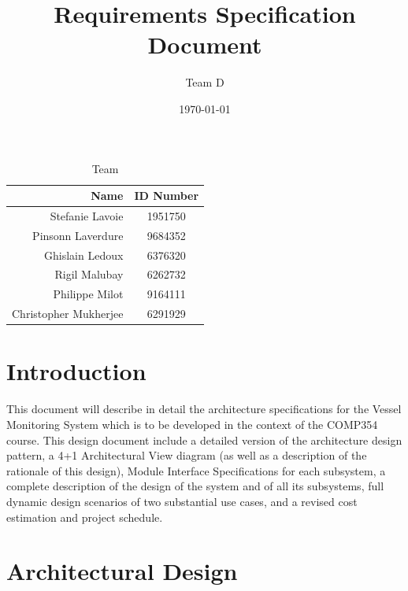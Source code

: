 \documentclass{article}
\begin{document}
\title{Requirements Specification Document}
\author{Team D}
\date{\today}

\maketitle

\vspace*{3.5in}
\begin{table}[htbp]
\caption{Team}
\begin{center}
\begin{tabular}{|r | c|}
\hline
Name & ID Number \\
\hline\hline
Stefanie Lavoie & 1951750 \\
Pinsonn Laverdure & 9684352 \\
Ghislain Ledoux & 6376320 \\
Rigil Malubay & 6262732 \\
Philippe Milot & 9164111 \\
Christopher Mukherjee & 6291929 \\
\hline
\end{tabular}
\end{center}
\end{table}

\clearpage

\tableofcontents
\clearpage


\section{Introduction} %

This document will describe in detail the architecture specifications for the Vessel Monitoring System which is to be developed in the context of the COMP354 course. This design document include a detailed version of the architecture design pattern, a 4+1 Architectural View diagram (as well as a description of the rationale of this design), Module Interface Specifications for each subsystem, a complete description of the design of the system and of all its subsystems, full dynamic design scenarios of two substantial use cases, and a revised cost estimation and project schedule.

\section{Architectural Design} %
\end{document}
